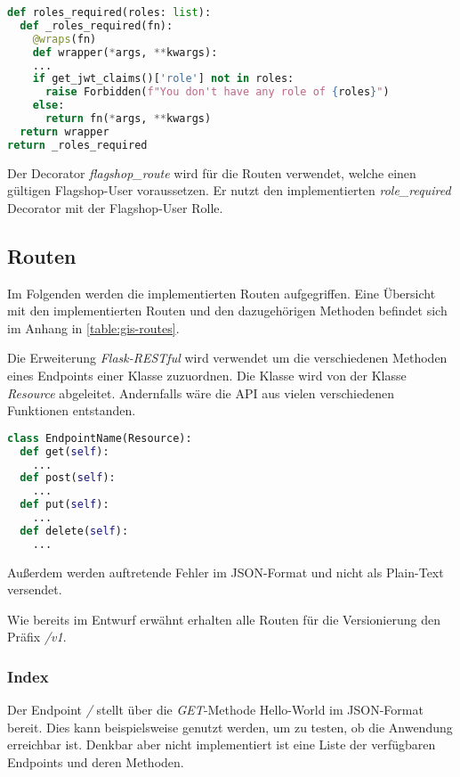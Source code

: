 \begin{lstlisting}[language=Python, frame=single, caption={GIS Berechtigungsprüfung}, captionpos=b, label={lst:gis-permission-wrapper}]
def roles_required(roles: list):
  def _roles_required(fn):
    @wraps(fn)
    def wrapper(*args, **kwargs):
    ...
    if get_jwt_claims()['role'] not in roles:
      raise Forbidden(f"You don't have any role of {roles}")
    else:
      return fn(*args, **kwargs)
  return wrapper
return _roles_required
\end{lstlisting}

Der Decorator \textit{flagshop\_route} wird für die Routen verwendet, welche einen gültigen Flagshop-User voraussetzen. Er nutzt den implementierten \textit{role\_required} Decorator mit der Flagshop-User Rolle.

\subsection{Routen} \label{sub:realisierung-gis-routen}
Im Folgenden werden die implementierten Routen aufgegriffen. Eine Übersicht mit den implementierten Routen und den dazugehörigen Methoden befindet sich im Anhang in \autoref{table:gis-routes}.

Die Erweiterung \textit{Flask-RESTful} wird verwendet um die verschiedenen Methoden eines Endpoints einer Klasse zuzuordnen. Die Klasse wird von der Klasse \textit{Resource} abgeleitet. Andernfalls wäre die API aus vielen verschiedenen Funktionen entstanden.

\begin{lstlisting}[language=Python, frame=single, caption={GIS Endpoint}, captionpos=b, label={lst:gis-endpoint}]
class EndpointName(Resource):
  def get(self):
    ...
  def post(self):
    ...
  def put(self):
    ...
  def delete(self):
    ...
\end{lstlisting}

Außerdem werden auftretende Fehler im JSON-Format und nicht als Plain-Text versendet. 

Wie bereits im Entwurf erwähnt erhalten alle Routen für die Versionierung den Präfix \textit{/v1}.

\subsubsection{Index}
Der Endpoint \textit{/} stellt über die \textit{GET}-Methode Hello-World im JSON-Format bereit. Dies kann beispielsweise genutzt werden, um zu testen, ob die Anwendung erreichbar ist. Denkbar aber nicht implementiert ist eine Liste der verfügbaren Endpoints und deren Methoden.

